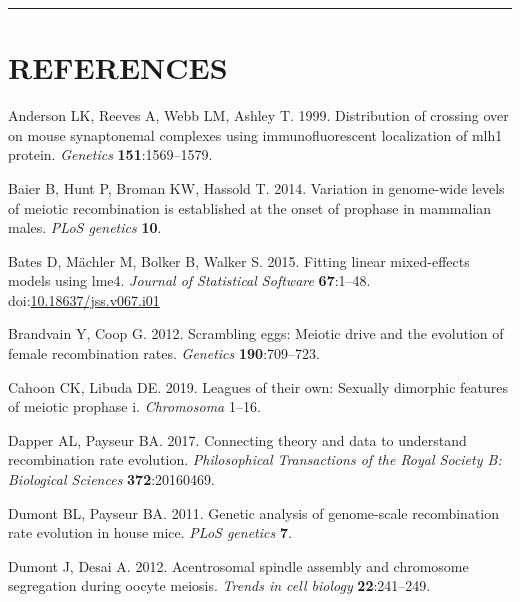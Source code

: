 \documentclass[
]{article}
\begin{document}
\begin{center}\rule{0.5\linewidth}{0.5pt}\end{center}

\hypertarget{references}{%
\section*{REFERENCES}\label{references}}

\hypertarget{refs}{}
\leavevmode\hypertarget{ref-anderson1999}{}%
Anderson LK, Reeves A, Webb LM, Ashley T. 1999. Distribution of crossing
over on mouse synaptonemal complexes using immunofluorescent
localization of mlh1 protein. \emph{Genetics} \textbf{151}:1569--1579.

\leavevmode\hypertarget{ref-baier2014}{}%
Baier B, Hunt P, Broman KW, Hassold T. 2014. Variation in genome-wide
levels of meiotic recombination is established at the onset of prophase
in mammalian males. \emph{PLoS genetics} \textbf{10}.

\leavevmode\hypertarget{ref-lme4}{}%
Bates D, Mächler M, Bolker B, Walker S. 2015. Fitting linear
mixed-effects models using lme4. \emph{Journal of Statistical Software}
\textbf{67}:1--48.
doi:\href{https://doi.org/10.18637/jss.v067.i01}{10.18637/jss.v067.i01}

\leavevmode\hypertarget{ref-brandvain2012scrambling}{}%
Brandvain Y, Coop G. 2012. Scrambling eggs: Meiotic drive and the
evolution of female recombination rates. \emph{Genetics}
\textbf{190}:709--723.

\leavevmode\hypertarget{ref-CahoonLibuda2019}{}%
Cahoon CK, Libuda DE. 2019. Leagues of their own: Sexually dimorphic
features of meiotic prophase i. \emph{Chromosoma} 1--16.

\leavevmode\hypertarget{ref-DapperPayseur2017}{}%
Dapper AL, Payseur BA. 2017. Connecting theory and data to understand
recombination rate evolution. \emph{Philosophical Transactions of the
Royal Society B: Biological Sciences} \textbf{372}:20160469.

\leavevmode\hypertarget{ref-dumont2011}{}%
Dumont BL, Payseur BA. 2011. Genetic analysis of genome-scale
recombination rate evolution in house mice. \emph{PLoS genetics}
\textbf{7}.

\leavevmode\hypertarget{ref-dumontDesai2012}{}%
Dumont J, Desai A. 2012. Acentrosomal spindle assembly and chromosome
segregation during oocyte meiosis. \emph{Trends in cell biology}
\textbf{22}:241--249.
\end{document}
